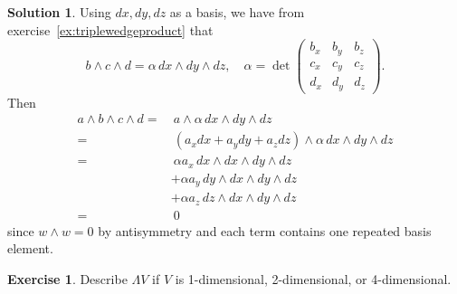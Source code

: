 \documentclass[11pt, a4paper]{report}
\theoremstyle{definition}
\newtheorem{ex}{Exercise}[part]
\newtheorem{sol}{Solution}[part]
\begin{document}
\begin{sol}

Using $dx, dy, dz$ as a basis, we have from exercise~\ref{ex:triplewedgeproduct} that
\[
    b \wedge c \wedge d = \alpha \, dx \wedge dy \wedge dz, \quad
    \alpha = \det \begin{pmatrix}
        b_x & b_y & b_z \\
        c_x & c_y & c_z \\
        d_x & d_y & d_z
    \end{pmatrix}.
\]
Then
\begin{align*}
    a \wedge b \wedge c \wedge d =&\ a \wedge \alpha \, dx \wedge dy \wedge dz \\
        =&\ (a_x dx + a_y dy + a_z dz) \wedge \alpha \, dx \wedge dy \wedge dz \\
        =&\ \alpha a_x \, dx \wedge dx \wedge dy \wedge dz \\
        &+ \alpha a_y \, dy \wedge dx \wedge dy \wedge dz \\
        &+ \alpha a_z \, dz \wedge dx \wedge dy \wedge dz \\
        =&\ 0
\end{align*}
since $w \wedge w = 0$ by antisymmetry and each term contains one repeated basis element.

\end{sol}

\begin{ex}

Describe $\Lambda V$ if $V$ is 1-dimensional, 2-dimensional, or 4-dimensional.

\end{ex}
\end{document}
